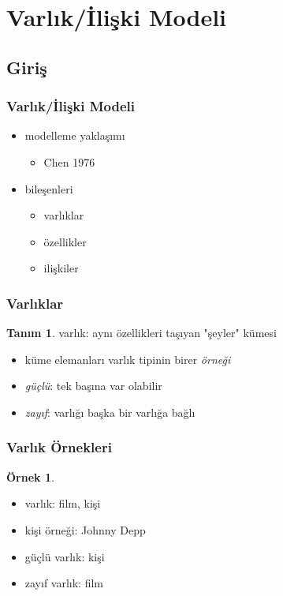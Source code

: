 \documentclass[dvipsnames]{beamer}
\theoremstyle{definition}
\newtheorem{tanim}[theorem]{Tanım}
\theoremstyle{example}
\newtheorem{ornek}[theorem]{Örnek}
\theoremstyle{plain}
\begin{document}
\section{Varlık/İlişki Modeli}

\subsection{Giriş}

\begin{frame}
  \frametitle{Varlık/İlişki Modeli}

  \begin{itemize}
    \item modelleme yaklaşımı
    \begin{itemize}
      \item Chen 1976
    \end{itemize}

    \pause
    \item bileşenleri
    \begin{itemize}
      \item varlıklar
      \item özellikler
      \item ilişkiler
    \end{itemize}
  \end{itemize}
\end{frame}

\begin{frame}
  \frametitle{Varlıklar}

  \begin{tanim}
    \alert{varlık}: aynı özellikleri taşıyan "şeyler" kümesi

    \pause
    \begin{itemize}
      \item küme elemanları varlık tipinin birer \emph{örneği}
    \end{itemize}

    \pause
    \begin{itemize}
      \item \emph{güçlü}: tek başına var olabilir
      \item \emph{zayıf}: varlığı başka bir varlığa bağlı
    \end{itemize}
  \end{tanim}
\end{frame}

\begin{frame}
  \frametitle{Varlık Örnekleri}

  \begin{ornek}
    \begin{itemize}
      \item varlık: film, kişi

      \pause
      \item kişi örneği: Johnny Depp

      \pause
      \medskip
      \item güçlü varlık: kişi
      \item zayıf varlık: film
    \end{itemize}
  \end{ornek}
\end{frame}
\end{document}
